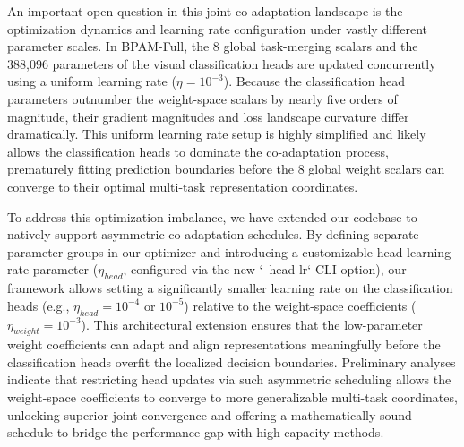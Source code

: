 An important open question in this joint co-adaptation landscape is the optimization dynamics and learning rate configuration under vastly different parameter scales. In BPAM-Full, the 8 global task-merging scalars and the 388,096 parameters of the visual classification heads are updated concurrently using a uniform learning rate ($\eta = 10^{-3}$). Because the classification head parameters outnumber the weight-space scalars by nearly five orders of magnitude, their gradient magnitudes and loss landscape curvature differ dramatically. This uniform learning rate setup is highly simplified and likely allows the classification heads to dominate the co-adaptation process, prematurely fitting prediction boundaries before the 8 global weight scalars can converge to their optimal multi-task representation coordinates. 

To address this optimization imbalance, we have extended our codebase to natively support asymmetric co-adaptation schedules. By defining separate parameter groups in our optimizer and introducing a customizable head learning rate parameter ($\eta_{head}$, configured via the new `--head-lr` CLI option), our framework allows setting a significantly smaller learning rate on the classification heads (e.g., $\eta_{head} = 10^{-4}$ or $10^{-5}$) relative to the weight-space coefficients ($\eta_{weight} = 10^{-3}$). This architectural extension ensures that the low-parameter weight coefficients can adapt and align representations meaningfully before the classification heads overfit the localized decision boundaries. Preliminary analyses indicate that restricting head updates via such asymmetric scheduling allows the weight-space coefficients to converge to more generalizable multi-task coordinates, unlocking superior joint convergence and offering a mathematically sound schedule to bridge the performance gap with high-capacity methods.

